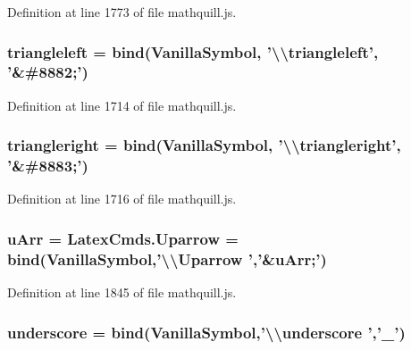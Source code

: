 Definition at line 1773 of file mathquill.\-js.

\subsubsection[{triangleleft}]{ triangleleft = {\bf bind}({\bf Vanilla\-Symbol}, '\textbackslash{}\textbackslash{}triangleleft', '\&\#8882;')}\label{mathquill_8js_a25dffac1aa199b21ee5dd37873b277d6}


Definition at line 1714 of file mathquill.\-js.

\subsubsection[{triangleright}]{ triangleright = {\bf bind}({\bf Vanilla\-Symbol}, '\textbackslash{}\textbackslash{}triangleright', '\&\#8883;')}\label{mathquill_8js_acdd081a909d27bd61f0da1f4615122a5}


Definition at line 1716 of file mathquill.\-js.

\subsubsection[{u\-Arr}]{ u\-Arr = Latex\-Cmds.\-Uparrow = {\bf bind}({\bf Vanilla\-Symbol},'\textbackslash{}\textbackslash{}Uparrow ','\&u\-Arr;')}\label{mathquill_8js_ac52ac3e470d2670b087443832672cdce}


Definition at line 1845 of file mathquill.\-js.

\subsubsection[{underscore}]{ underscore = {\bf bind}({\bf Vanilla\-Symbol},'\textbackslash{}\textbackslash{}underscore ','{\bf \-\_\-}')}\label{mathquill_8js_a52fb41fc3a70190aeb72c94770d9a906}


